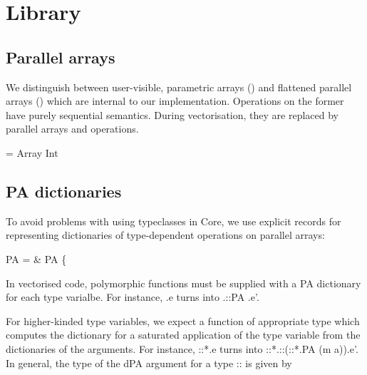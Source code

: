 \documentclass{article}
\begin{document}
\section*{Library}

\subsection*{Parallel arrays}

We distinguish between user-visible, parametric arrays (\<\pparr{\cdot}\>) and 
flattened parallel arrays (\<\parr{\cdot}\>) which are internal to our
implementation. Operations on the former have purely sequential semantics.
During vectorisation, they are replaced by parallel arrays and operations.

\begin{haskell}
\Data \pparr{\alpha} = Array Int \alpha  {} \\
\DataF \parr{\alpha}
\end{haskell}

\subsection*{\<PA\> dictionaries}

To avoid problems with using typeclasses in Core, we use explicit records for
representing dictionaries of type-dependent operations on parallel arrays:

\begin{haskell}
\Data PA \alpha = & PA \{
\end{haskell}

In vectorised code, polymorphic functions must be supplied with a \<PA\>
dictionary for each type varialbe. For instance, \<\Lambda\alpha.e\> turns
into \<\Lambda\alpha.::PA \alpha.e'\>.

For higher-kinded type variables, we expect a function of appropriate type
which computes the dictionary for a saturated application of the type
variable from the dictionaries of the arguments. For instance,
\<::{*}\to{*}.e\> turns into
\<::{*}\to{*}.::(\forall\alpha::{*}.PA \alpha{}
(m a)).e'\>.
In general, the type of the \<dPA\> argument for a type \<\sigma::\kappa\> is
given by
\end{document}
